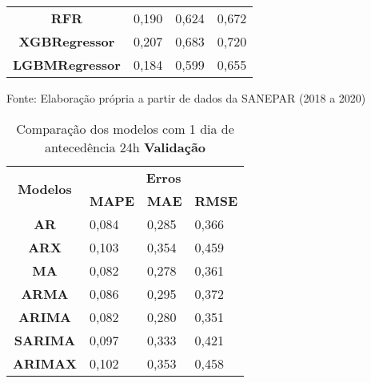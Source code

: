 \begin{table}[H]
\begin{tabular}{@{}clll@{}}
\textbf{RFR}                      & 0,190                             & 0,624                            & 0,672                             \\
\textbf{XGBRegressor}             & 0,207                             & 0,683                            & 0,720                             \\
\textbf{LGBMRegressor}            & 0,184                             & 0,599                            & 0,655                             \\ \bottomrule
	\end{tabular}

Fonte: Elaboração própria a partir de dados da SANEPAR (2018 a 2020)
\end{table}

\begin{table}[H]
	\centering
	\caption{Comparação dos modelos com 1 dia de antecedência 24h \textbf{Validação} }\label{tb:1-24vld}
	\begin{tabular}{@{}clll@{}}
		\toprule
		\multirow{2}{*}{\textbf{Modelos}} & \multicolumn{3}{c}{\textbf{Erros}}                                                                       \\ \cmidrule(l){2-4} 
		& \multicolumn{1}{c}{\textbf{MAPE}} & \multicolumn{1}{c}{\textbf{MAE}} & \multicolumn{1}{c}{\textbf{RMSE}} \\ \hline
\textbf{AR}                       & 0,084                             & 0,285                            & 0,366                             \\
\textbf{ARX}                      & 0,103                             & 0,354                            & 0,459                             \\
\textbf{MA}                       & 0,082                             & 0,278                            & 0,361                             \\
\textbf{ARMA}                     & 0,086                             & 0,295                            & 0,372                             \\
\textbf{ARIMA}                    & 0,082                             & 0,280                            & 0,351                             \\
\textbf{SARIMA}                   & 0,097                             & 0,333                            & 0,421                             \\
\textbf{ARIMAX}                   & 0,102                             & 0,353                            & 0,458                             \\

\end{tabular}
\end{table}
